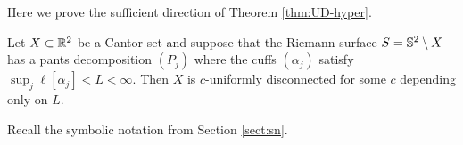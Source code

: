 \documentclass{amsart}
\begin{document}
Here we prove the sufficient direction of Theorem \ref{thm:UD-hyper}.

\begin{proposition}\label{prop:UDsuff}
Let $X \subset \R^2$ be a Cantor set and suppose that the Riemann surface $S=\S^2\setminus X$ has a pants decomposition $(P_j)$ where the cuffs $(\alpha_j)$ satisfy $\sup_j\ell [ \alpha_j ] <L<\infty$. Then $X$ is $c$-uniformly disconnected for some $c$ depending only on $L$.
\end{proposition}





%

Recall the symbolic notation from Section \ref{sect:sn}.
\end{document}
